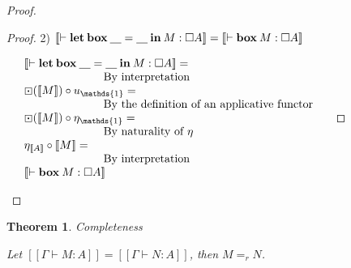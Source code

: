 \documentclass[a4paper]{article}
\newtheorem{theorem}{Theorem}
\begin{document}
\begin{proof}
\begin{proof}
\vspace{\baselineskip}

2) $[\![\vdash {\bf let \: box \:} \underline{\quad} = \underline {\quad} {\: \bf in \:} M : \Box A]\!] = [\![\vdash {\bf box \:} M : \Box A]\!]$

$\begin{array}{lll}
&[\![\vdash {\bf let \: box \:} \underline{\quad} = \underline {\quad} {\: \bf in \:} M : \Box A]\!] = & \\
&\quad\quad\quad\quad\quad\quad\quad \text{By interpretation}& \\
&\boxdot ([\![M]\!]) \circ u_{\mathds{1}} = & \\
&\quad\quad\quad\quad\quad\quad\quad \text{By the definition of an applicative functor}& \\
&\boxdot ([\![M]\!]) \circ \eta_{\mathds{1}} = & \\
&\quad\quad\quad\quad\quad\quad\quad \text{By naturality of $\eta$} & \\
&\eta_{[\![A]\!]} \circ [\![M]\!] = &\\
&\quad\quad\quad\quad\quad\quad\quad \text{By interpretation} & \\
&[\![\vdash {\bf box \:} M : \Box A]\!]&
\end{array}$
\end{proof}

\end{proof}

\begin{theorem} Completeness

Let $[\![\Gamma \vdash M : A]\!] = [\![\Gamma \vdash N : A]\!]$, then $M =_r N$.
\end{theorem}
\end{document}
